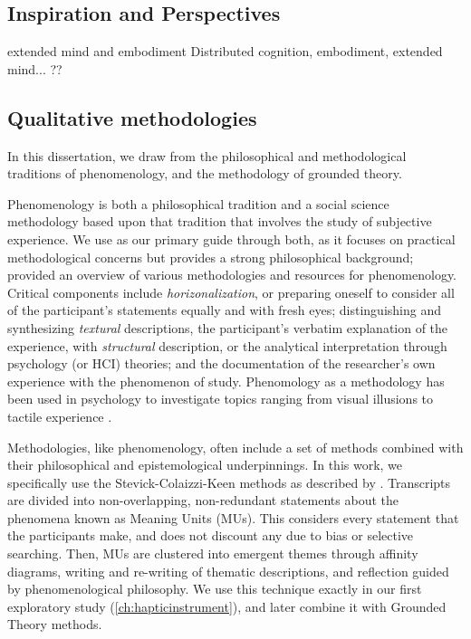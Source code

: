 \subsection{Inspiration and Perspectives}

extended mind and embodiment
Distributed cognition, embodiment, extended mind...
??

\subsection{Qualitative methodologies}
In this dissertation, we draw from the philosophical and methodological traditions of phenomenology, and the methodology of grounded theory.

Phenomenology is both a philosophical tradition and a social science methodology based upon that tradition that involves the study of subjective experience.
We use \citet{Moustakas1994} as our primary guide through both, as it focuses on practical methodological concerns but provides a strong philosophical background; \citet{Creswell2013} provided an overview of various methodologies and resources for phenomenology.
Critical components include \emph{horizonalization}, or preparing oneself to consider all of the participant's statements equally and with fresh eyes; distinguishing and synthesizing \emph{textural} descriptions, \eg the participant's verbatim explanation of the experience, with \emph{structural} description, or the analytical interpretation through psychology (or HCI) theories; and the documentation of the researcher's own experience with the phenomenon of study.
Phenomology as a methodology has been used in psychology to investigate topics ranging from visual illusions to tactile experience \cite{Richer1978, Obrist2013, Creswell2013}.

Methodologies, like phenomenology, often include a set of methods combined with their philosophical and epistemological underpinnings.
In this work, we specifically use the Stevick-Colaizzi-Keen methods as described by \citet{Moustakas1994}.
Transcripts are divided into non-overlapping, non-redundant statements about the phenomena known as Meaning Units (MUs).
This considers every statement that the participants make, and does not discount any due to bias or selective searching.
Then, MUs are clustered into emergent themes through affinity diagrams, writing and re-writing of thematic descriptions, and reflection guided by phenomenological philosophy.
We use this technique exactly in our first exploratory study (\autoref{ch:hapticinstrument}), and later combine it with Grounded Theory methods.

